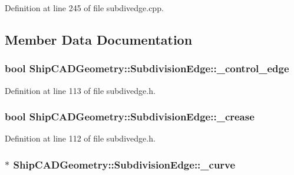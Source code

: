 Definition at line 245 of file subdivedge.\-cpp.



\subsection{Member Data Documentation}
\hypertarget{classShipCADGeometry_1_1SubdivisionEdge_a0253d92464fa44ece75199bafc2ab604}{
\subsubsection[{\-\_\-control\-\_\-edge}]{\setlength{\rightskip}{0pt plus 5cm}bool Ship\-C\-A\-D\-Geometry\-::\-Subdivision\-Edge\-::\-\_\-control\-\_\-edge\hspace{0.3cm}{\ttfamily [protected]}}}\label{classShipCADGeometry_1_1SubdivisionEdge_a0253d92464fa44ece75199bafc2ab604}


Definition at line 113 of file subdivedge.\-h.

\hypertarget{classShipCADGeometry_1_1SubdivisionEdge_ae098b2abe43d484178e743a4e0ee2dd1}{
\subsubsection[{\-\_\-crease}]{\setlength{\rightskip}{0pt plus 5cm}bool Ship\-C\-A\-D\-Geometry\-::\-Subdivision\-Edge\-::\-\_\-crease\hspace{0.3cm}{\ttfamily [protected]}}}\label{classShipCADGeometry_1_1SubdivisionEdge_ae098b2abe43d484178e743a4e0ee2dd1}


Definition at line 112 of file subdivedge.\-h.

\hypertarget{classShipCADGeometry_1_1SubdivisionEdge_ae3d4de49a5c6b332d52a6c4e98704183}{
\subsubsection[{\-\_\-curve}]{$\ast$ Ship\-C\-A\-D\-Geometry\-::\-Subdivision\-Edge\-::\-\_\-curve\hspace{0.3cm}{\ttfamily [protected]}}}\label{classShipCADGeometry_1_1SubdivisionEdge_ae3d4de49a5c6b332d52a6c4e98704183}


